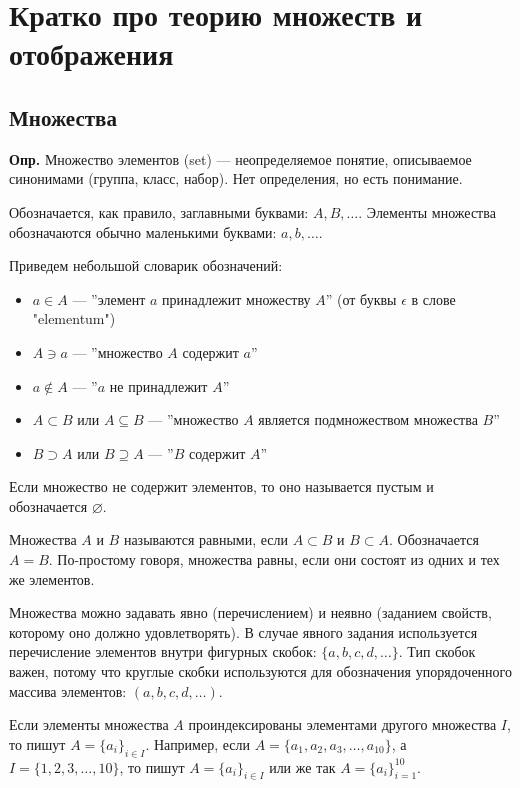 \documentclass[a4paper,12pt]{article}
\newcounter{z-counter}
\newcounter{th-counter}
\newcounter{df-counter}
\newcommand{\df}{\par\noindent\textbf{Опр.} }
\begin{document}
\tableofcontents  %

\section*{Кратко про теорию множеств и отображения}
\subsection*{Множества}
\df Множество элементов (set) --- неопределяемое понятие, описываемое синонимами (группа, класс, набор). Нет определения, но есть понимание.

Обозначается, как правило, заглавными буквами: $A, B, \ldots$. Элементы множества обозначаются обычно маленькими буквами: $a, b, \ldots$.

Приведем небольшой словарик обозначений:
\begin{itemize}
    \item $a \in A$ --- ''элемент $a$ принадлежит множеству $A$'' (от буквы $\epsilon$ в слове "elementum")
    \item $A \ni a$ --- ''множество $A$ содержит $a$''
    \item $a \not\in A$ --- ''$a$ не принадлежит $A$''
    \item $A \subset B$ или $A \subseteq B$ --- ''множество $A$ является подмножеством множества $B$''
    \item $B \supset A$ или $B \supseteq A$ --- ''$B$ содержит $A$''
\end{itemize}

Если множество не содержит элементов, то оно называется пустым и обозначается $\varnothing$.

Множества $A$ и $B$ называются равными, если $A \subset B$ и $B \subset A$. Обозначается \mbox{$A = B$}. По-простому говоря, множества равны, если они состоят из одних и тех же элементов.

Множества можно задавать явно (перечислением) и неявно (заданием свойств, которому оно должно удовлетворять). В случае явного задания используется перечисление элементов внутри фигурных скобок: $\{a, b, c, d, \ldots\}$. Тип скобок важен, потому что круглые скобки используются для обозначения упорядоченного массива элементов: $(a, b, c, d, \ldots)$.

Если элементы множества $A$ проиндексированы элементами другого множества $I$, то пишут $A = \{a_i\}_{i \in I}$. Например, если $A = \{a_1, a_2, a_3, \ldots, a_{10}\}$, а $I = \{1, 2, 3, \ldots, 10\}$, то пишут $A = \{a_i\}_{i \in I}$ или же так $A = \{a_i\}_{i=1}^{10}$.
\end{document}
